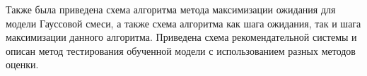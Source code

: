 Также была приведена схема алгоритма метода максимизации ожидания для модели Гауссовой смеси, а также схема алгоритма как шага ожидания, так и шага максимизации данного алгоритма. Приведена схема рекомендательной системы и описан метод тестирования обученной модели с использованием разных методов оценки.

\pagebreak